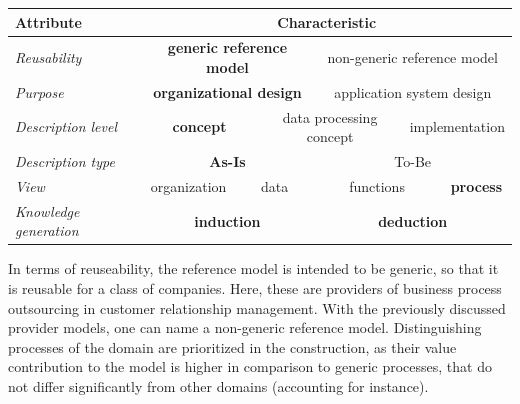 \begin{table}[caption={Reference model requirements }, label=tab:morph]
	\centering
		\begin{tabular}{ 
				p{3.1cm}  
			p{2cm} p{2cm} p{2cm} p{2cm} p{2cm} p{2cm} p{2cm} p{2cm} p{2cm} p{2cm} p{2cm} p{2cm}    }
			Attribute                                   & \multicolumn{12}{c}{ Characteristic }                                                                                                                  \\ \hline
			\multicolumn{1}{|l|}{\textit{Reusability}}          & \multicolumn{6}{c|}{\textbf{generic reference model}}                       & \multicolumn{6}{c|}{non-generic reference model}                  \\ \hline
			\multicolumn{1}{|l|}{\textit{Purpose}}              & \multicolumn{6}{c|}{\textbf{organizational design}}                         & \multicolumn{6}{c|}{application system design}                    \\ \hline
			\multicolumn{1}{|l|}{\textit{Description level}}    & \multicolumn{4}{c|}{\textbf{concept}}                & \multicolumn{4}{c|}{data processing concept} & \multicolumn{4}{c|}{implementation}       \\ \hline
			\multicolumn{1}{|l|}{\textit{Description type}}     & \multicolumn{6}{c|}{\textbf{As-Is}}                  & \multicolumn{6}{c|}{To-Be}                             \\ \hline
			\multicolumn{1}{|l|}{\textit{View}}                 & \multicolumn{3}{c|}{organization} & \multicolumn{3}{c|}{data}    & \multicolumn{3}{c|}{functions}   & \multicolumn{3}{c|}{\textbf{process}} \\ \hline
			\multicolumn{1}{|l|}{\textit{Knowledge generation}} & \multicolumn{6}{c|}{\textbf{induction}}                                     & \multicolumn{6}{c|}{\textbf{deduction}}                                    \\ \hline 
		
			
	\end{tabular}
\end{table}

In terms of reuseability, the reference model is intended to be generic, so that it is reusable for a class of companies. Here, these are providers of business process outsourcing in customer relationship management. With the previously discussed provider models, one can name a non-generic reference model. Distinguishing processes of the domain are prioritized in the construction, as their value contribution to the model is higher in comparison to generic processes, that do not differ significantly from other domains (accounting for instance).  

